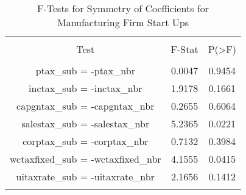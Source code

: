 
\begin{table}[!htbp] \centering 
  \caption{F-Tests for Symmetry of Coefficients for Manufacturing Firm Start Ups} 
  \label{31-33Ftests} 
\begin{tabular}{@{\extracolsep{5pt}} ccc} 
\\[-1.8ex]\hline 
\hline \\[-1.8ex] 
Test & F-Stat & P(\textgreater F) \\ 
\hline \\[-1.8ex] 
ptax\_sub = -ptax\_nbr & 0.0047 & 0.9454 \\ 
inctax\_sub = -inctax\_nbr & 1.9178 & 0.1661 \\ 
capgntax\_sub = -capgntax\_nbr & 0.2655 & 0.6064 \\ 
salestax\_sub = -salestax\_nbr & 5.2365 & 0.0221 \\ 
corptax\_sub = -corptax\_nbr & 0.7132 & 0.3984 \\ 
wctaxfixed\_sub = -wctaxfixed\_nbr & 4.1555 & 0.0415 \\ 
uitaxrate\_sub = -uitaxrate\_nbr & 2.1656 & 0.1412 \\ 
\hline \\[-1.8ex] 
\end{tabular} 
\end{table} 
